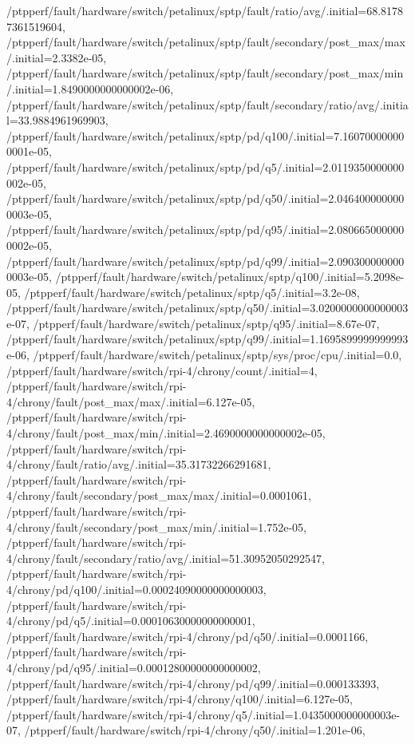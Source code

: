 {    /ptpperf/fault/hardware/switch/petalinux/sptp/fault/ratio/avg/.initial=68.81787361519604,
    /ptpperf/fault/hardware/switch/petalinux/sptp/fault/secondary/post_max/max/.initial=2.3382e-05,
    /ptpperf/fault/hardware/switch/petalinux/sptp/fault/secondary/post_max/min/.initial=1.8490000000000002e-06,
    /ptpperf/fault/hardware/switch/petalinux/sptp/fault/secondary/ratio/avg/.initial=33.9884961969903,
    /ptpperf/fault/hardware/switch/petalinux/sptp/pd/q100/.initial=7.160700000000001e-05,
    /ptpperf/fault/hardware/switch/petalinux/sptp/pd/q5/.initial=2.0119350000000002e-05,
    /ptpperf/fault/hardware/switch/petalinux/sptp/pd/q50/.initial=2.0464000000000003e-05,
    /ptpperf/fault/hardware/switch/petalinux/sptp/pd/q95/.initial=2.0806650000000002e-05,
    /ptpperf/fault/hardware/switch/petalinux/sptp/pd/q99/.initial=2.0903000000000003e-05,
    /ptpperf/fault/hardware/switch/petalinux/sptp/q100/.initial=5.2098e-05,
    /ptpperf/fault/hardware/switch/petalinux/sptp/q5/.initial=3.2e-08,
    /ptpperf/fault/hardware/switch/petalinux/sptp/q50/.initial=3.0200000000000003e-07,
    /ptpperf/fault/hardware/switch/petalinux/sptp/q95/.initial=8.67e-07,
    /ptpperf/fault/hardware/switch/petalinux/sptp/q99/.initial=1.1695899999999993e-06,
    /ptpperf/fault/hardware/switch/petalinux/sptp/sys/proc/cpu/.initial=0.0,
    /ptpperf/fault/hardware/switch/rpi-4/chrony/count/.initial=4,
    /ptpperf/fault/hardware/switch/rpi-4/chrony/fault/post_max/max/.initial=6.127e-05,
    /ptpperf/fault/hardware/switch/rpi-4/chrony/fault/post_max/min/.initial=2.4690000000000002e-05,
    /ptpperf/fault/hardware/switch/rpi-4/chrony/fault/ratio/avg/.initial=35.31732266291681,
    /ptpperf/fault/hardware/switch/rpi-4/chrony/fault/secondary/post_max/max/.initial=0.0001061,
    /ptpperf/fault/hardware/switch/rpi-4/chrony/fault/secondary/post_max/min/.initial=1.752e-05,
    /ptpperf/fault/hardware/switch/rpi-4/chrony/fault/secondary/ratio/avg/.initial=51.30952050292547,
    /ptpperf/fault/hardware/switch/rpi-4/chrony/pd/q100/.initial=0.00024090000000000003,
    /ptpperf/fault/hardware/switch/rpi-4/chrony/pd/q5/.initial=0.00010630000000000001,
    /ptpperf/fault/hardware/switch/rpi-4/chrony/pd/q50/.initial=0.0001166,
    /ptpperf/fault/hardware/switch/rpi-4/chrony/pd/q95/.initial=0.00012800000000000002,
    /ptpperf/fault/hardware/switch/rpi-4/chrony/pd/q99/.initial=0.000133393,
    /ptpperf/fault/hardware/switch/rpi-4/chrony/q100/.initial=6.127e-05,
    /ptpperf/fault/hardware/switch/rpi-4/chrony/q5/.initial=1.0435000000000003e-07,
    /ptpperf/fault/hardware/switch/rpi-4/chrony/q50/.initial=1.201e-06,
}
